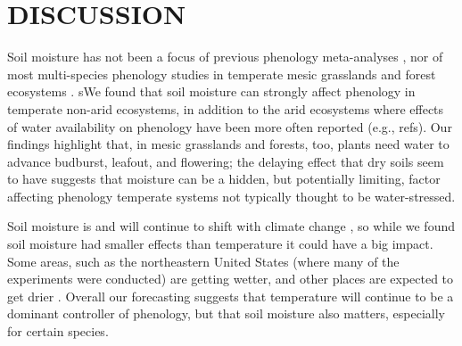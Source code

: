 \documentclass{article}
\begin{document}

\section* {DISCUSSION}
\par Soil moisture has not been a focus of previous phenology meta-analyses \cite[e.g.,][]{wolkovich2012}, nor of most multi-species phenology studies in temperate mesic grasslands and forest ecosystems \cite[e.g.,][]{Vitass2021}. sWe found that soil moisture can strongly affect phenology in temperate non-arid ecosystems, in addition to the arid ecosystems where effects of water availability on phenology have been more often reported (e.g., refs). Our findings highlight that, in mesic grasslands and forests, too, plants need water to advance budburst, leafout, and flowering; the delaying effect that dry soils seem to have suggests that moisture can be a hidden, but potentially limiting, factor affecting phenology temperate systems not typically thought to be water-stressed. 

\par Soil moisture is and will continue to shift with climate change \citep{berg2017}, so while we found soil moisture had smaller effects than temperature it could have a big impact. Some areas, such as the northeastern United States (where many of the experiments were conducted) are getting wetter, and other places are expected to get drier \citep{berg2017}. Overall our forecasting suggests that temperature will continue to be a dominant controller of phenology, but that soil moisture also matters, especially for certain species. 
\end{document}
